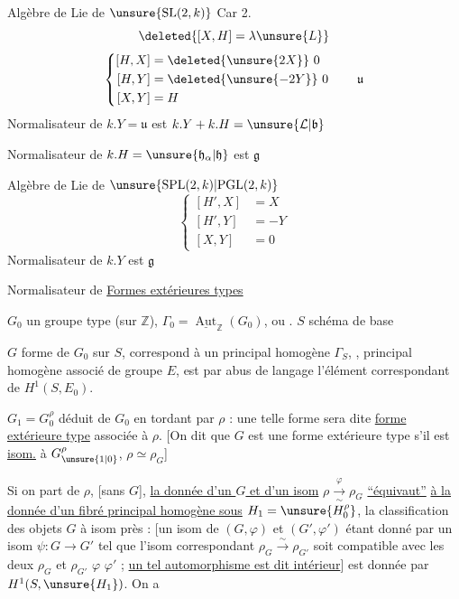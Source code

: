 Algèbre de Lie de $\unsure{\mathrm{SL}(2,k)}$ \hfill Car 2.
\[
\deleted{[X,H]=\lambda\unsure{L}}
\]
\[
\left\{\begin{aligned}
[H,X]&=\deleted{\unsure{2X}}\ 0\\
[H,Y]&=\deleted{\unsure{-2Y}}\ 0\\
[X,Y]&=H
\end{aligned}\right.
\qquad\mathfrak u
\]
Normalisateur de $k.Y=\mathfrak u$ est $k.Y+k.H=\unsure{\mathcal L|\mathfrak b}$

Normalisateur de $k.H=\unsure{\mathfrak h_\alpha|\mathfrak h}$ est $\mathfrak g$ 

Algèbre de Lie de $\unsure{\mathrm{SPL}(2,k)|\mathrm{PGL}(2,k)}$
\[
\left\{\begin{aligned}
[H',X]&=X\\
[H',Y]&=-Y\\
[X,Y]&=0
\end{aligned}\right.
\]
Normalisateur de $k.Y$ est $\mathfrak g$

Normalisateur de
\uline{Formes extérieures types}


$G_0$ un groupe  type (sur $\mathbb Z$), $\Gamma_0=\underline{\operatorname{Aut}}_{\mathbb Z}(G_0)$,  ou .
$S$ schéma de base

$G$ forme de $G_0$ sur $S$, correspond à un principal homogène  $\Gamma_S$, 
, principal homogène associé de groupe $E$,  est  par abus de langage l'élément correspondant de $H^1(S,E_0)$.

$G_1=G_0^\rho$ déduit de $G_0$ en tordant par $\rho$  : une telle  forme sera dite \uline{forme extérieure type} associée à $\rho$.
[On dit que $G$ est une forme extérieure type s'il est \uline{isom.} à $G_{\unsure{1|0}}^\rho$,   $\rho\simeq\rho_G$]

Si on part de $\rho$, [sans $G$], \uline{la donnée d'un $G$ et d'un isom} $\rho\xrightarrow[\sim]{\varphi}\rho_G$ \uline{``équivaut''} \uline{à la donnée d'un fibré principal homogène sous} $H_1=\unsure{H_0^\rho}$, la classification des objets $G$ à isom près :
[un isom de $(G,\varphi)$ et $(G',\varphi')$ étant donné par un isom $\psi:G\longrightarrow G'$ tel que l'isom correspondant $\rho_G\xrightarrow{\sim}\rho_{G'}$ soit compatible avec les deux $\rho_G$ et $\rho_{G'}$  $\varphi$ $\varphi'$ ; \uline{un tel automorphisme est dit intérieur}]   est donnée par $H^1(S,\unsure{H_1})$. On a

